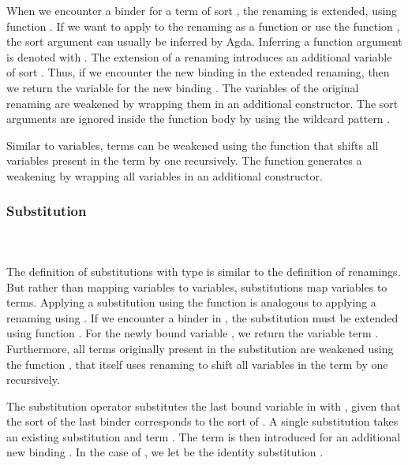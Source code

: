 \noindent When we encounter a binder for a term of sort , the renaming is extended, using function . 
If we want to apply to the renaming as a function or use the function , the sort argument  can usually be inferred by Agda. 
Inferring a function argument is denoted with \Sym{\_}. 
\Frenext
The extension of a renaming introduces an additional variable of sort . Thus, if we encounter the new binding  in the extended renaming, then we return the variable for the new binding . 
The variables  of the original renaming  are weakened by wrapping them in an additional  constructor. The sort arguments are ignored inside the function body by using the wildcard pattern \Sym{\_}.

\noindent Similar to variables, terms can be weakened using the function  that shifts all variables present in the term by one recursively. 
\Fwk 
The function  generates a weakening by wrapping all variables in an additional  constructor.
\Frenwk

\subsubsection{Substitution}\hfill\\\\
The definition of substitutions  with type    is similar to the definition of renamings. 
But rather than mapping variables to variables, substitutions map variables to terms.
\FSub
Applying a substitution using the  function is analogous to applying a renaming using . 
If we encounter a binder in , the substitution must be extended using function .
\Fext
For the newly bound variable , we return the variable term .  
Furthermore, all terms originally present in the substitution  are weakened using the function , that itself uses renaming to shift all variables in the term by one recursively.

\noindent The substitution operator  \Data{[}  \Data{]} substitutes the last bound variable in  with , given that the sort of the last binder corresponds to the sort of .
\Fsubs
A single substitution  takes an existing substitution  and term . The term  is then introduced for an additional new binding . 
\Fsinglesub
In the case of \Data{\_[\_]}, we let  be the identity substitution \Fidsub.

